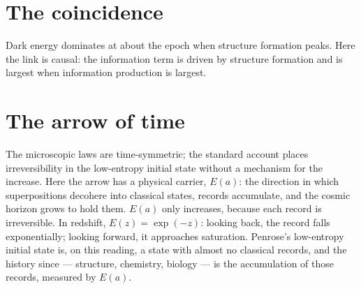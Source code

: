 \section{The coincidence}
Dark energy dominates at about the epoch when structure formation peaks. Here the link is causal: the information term is driven by structure
formation and is largest when information production is largest.

\section{The arrow of time}
The microscopic laws are time-symmetric; the standard account places irreversibility in the low-entropy initial state without a mechanism for the
increase. Here the arrow has a physical carrier, $E(a)$: the direction in which superpositions decohere into classical states, records accumulate, and
the cosmic horizon grows to hold them. $E(a)$ only increases, because each record is irreversible. In redshift, $E(z)=\exp(-z)$: looking back, the record
falls exponentially; looking forward, it approaches saturation. Penrose's low-entropy initial state is, on this reading, a state with almost no classical
records, and the history since --- structure, chemistry, biology --- is the accumulation of those records, measured by $E(a)$.
